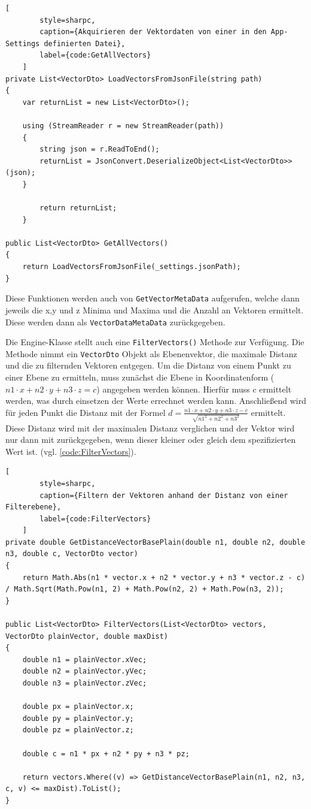 \begin{codeblock}
	\begin{lstlisting}[
		style=sharpc,
		caption={Akquirieren der Vektordaten von einer in den App-Settings definierten Datei},
		label={code:GetAllVectors}
	]
private List<VectorDto> LoadVectorsFromJsonFile(string path)
{
	var returnList = new List<VectorDto>();

	using (StreamReader r = new StreamReader(path))
	{
		string json = r.ReadToEnd();
		returnList = JsonConvert.DeserializeObject<List<VectorDto>>(json);
	}

		return returnList;
	}

public List<VectorDto> GetAllVectors()
{
	return LoadVectorsFromJsonFile(_settings.jsonPath);
}
	\end{lstlisting}
\end{codeblock}

Diese Funktionen werden auch von \texttt{GetVectorMetaData}
aufgerufen, welche dann jeweils die x,y und z Minima und Maxima und
die Anzahl an Vektoren ermittelt. Diese werden dann als
\texttt{VectorDataMetaData} zurückgegeben.

Die Engine-Klasse stellt auch eine \texttt{FilterVectors()} Methode zur Verfügung.
Die Methode nimmt ein \texttt{VectorDto} Objekt als Ebenenvektor, die maximale Distanz
und die zu filternden Vektoren entgegen. Um die Distanz von einem Punkt
zu einer Ebene zu ermitteln, muss zunächst die Ebene in Koordinatenform
($n1 \cdot x + n2 \cdot y + n3 \cdot z = c$) angegeben werden können.
Hierfür muss c ermittelt werden, was durch einsetzen der Werte
errechnet werden kann. Anschließend wird für jeden Punkt die Distanz
mit der Formel $d = \frac{n1 \cdot x + n2 \cdot y + n3 \cdot z - c}{\sqrt{n1^2 + n2^2 + n3^2}}$ ermittelt.
Diese Distanz wird mit der maximalen Distanz verglichen und der Vektor
wird nur dann mit zurückgegeben, wenn dieser kleiner oder gleich dem spezifizierten Wert ist.
(vgl. \lstlistingname\space \ref{code:FilterVectors}).

\begin{codeblock}
	\begin{lstlisting}[
		style=sharpc,
		caption={Filtern der Vektoren anhand der Distanz von einer Filterebene},
		label={code:FilterVectors}
	]
private double GetDistanceVectorBasePlain(double n1, double n2, double n3, double c, VectorDto vector)
{
	return Math.Abs(n1 * vector.x + n2 * vector.y + n3 * vector.z - c) / Math.Sqrt(Math.Pow(n1, 2) + Math.Pow(n2, 2) + Math.Pow(n3, 2));
}

public List<VectorDto> FilterVectors(List<VectorDto> vectors, VectorDto plainVector, double maxDist)
{
	double n1 = plainVector.xVec;
	double n2 = plainVector.yVec;
	double n3 = plainVector.zVec;

	double px = plainVector.x;
	double py = plainVector.y;
	double pz = plainVector.z;

	double c = n1 * px + n2 * py + n3 * pz;

	return vectors.Where((v) => GetDistanceVectorBasePlain(n1, n2, n3, c, v) <= maxDist).ToList();
}
	\end{lstlisting}
\end{codeblock}

